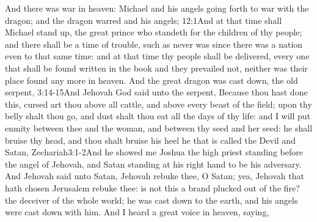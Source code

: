  And there was war in heaven: Michael and his angels going forth to war with the dragon; and the dragon warred and his angels;%
					{12:1}{And at that time shall Michael stand up, the great prince who standeth for the children of thy people; and there shall be a time of trouble, such as never was since there was a nation even to that same time: and at that time thy people shall be delivered, every one that shall be found written in the book}
 and they prevailed not, neither was their place found any more in heaven.%
 And the great dragon was cast down, the old serpent,%
						{3:14-15}{And Jehovah God said unto the serpent, Because thou hast done this, cursed art thou above all cattle, and above every beast of the field; upon thy belly shalt thou go, and dust shalt thou eat all the days of thy life: and I will put enmity between thee and the woman, and between thy seed and her seed: he shall bruise thy head, and thou shalt bruise his heel}
 he that is called the Devil and Satan,%
		{Zechariah}{3:1-2}{And he showed me Joshua the high priest standing before the angel of Jehovah, and Satan standing at his right hand to be his adversary. And Jehovah said unto Satan, Jehovah rebuke thee, O Satan; yea, Jehovah that hath chosen Jerusalem rebuke thee: is not this a brand plucked out of the fire?}
 the deceiver of the whole world; he was cast down to the earth, and his angels were cast down with him. 
 And I heard a great voice in heaven, saying,

